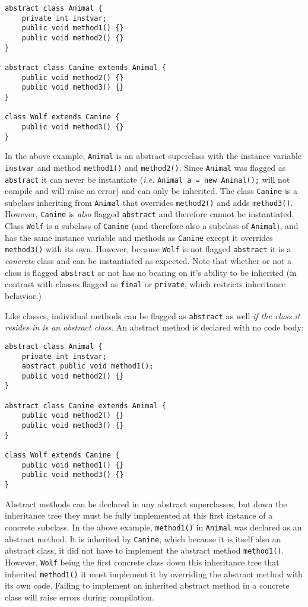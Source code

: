 \documentclass{tufte-handout}
\begin{document}
    \begin{lstlisting}
abstract class Animal {
    private int instvar;
    public void method1() {}
    public void method2() {}
}

abstract class Canine extends Animal {
    public void method2() {}
    public void method3() {}
}

class Wolf extends Canine {
    public void method3() {}
}
    \end{lstlisting}

    In the above example, \texttt{Animal} is an abstract superclass with the instance variable \texttt{instvar} and method \texttt{method1()} and \texttt{method2()}. Since \texttt{Animal} was flagged as \texttt{abstract} it can never be instantiate (\textit{i.e.} \texttt{Animal a = new Animal();} will not compile and will raise an error) and can only be inherited. The class \texttt{Canine} is a subclass inheriting from \texttt{Animal} that overrides \texttt{method2()} and adds \texttt{method3()}. However, \texttt{Canine} is \emph{also} flagged \texttt{abstract} and therefore cannot be instantiated. Class \texttt{Wolf} is a subclass of \texttt{Canine} (and therefore also a subclass of \texttt{Animal}), and has the same instance variable and methods as \texttt{Canine} except it overrides \texttt{method3()} with its own. However, because \texttt{Wolf} is not flagged \texttt{abstract} it is a \emph{concrete} class and can be instantiated as expected. Note that whether or not a class is flagged \texttt{abstract} or not has no bearing on it's ability to be inherited (in contrast with classes flagged as \texttt{final} or \texttt{private}, which restricts inheritance behavior.)

    Like classes, individual methods can be flagged as \texttt{abstract} as well \emph{if the class it resides in is an abstract class}. An abstract method is declared with no code body:

    \begin{lstlisting}
abstract class Animal {
    private int instvar;
    abstract public void method1();
    public void method2() {}
}

abstract class Canine extends Animal {
    public void method2() {}
    public void method3() {}
}

class Wolf extends Canine {
    public void method1() {}
    public void method3() {}
}

    \end{lstlisting}

    Abstract methods can be declared in any abstract superclasses, but down the inheritance tree they must be fully implemented at this first instance of a concrete subclass. In the above example, \texttt{method1()} in \texttt{Animal} was declared as an abstract method. It is inherited by \texttt{Canine}, which because it is itself also an abstract class, it did not have to implement the abstract method \texttt{method1()}. However, \texttt{Wolf} being the first concrete class down this inheritance tree that inherited \texttt{method1()} it must implement it by overriding the abstract method with its own code. Failing to implement an inherited abstract method in a concrete class will raise errors during compilation. 
\end{document}
